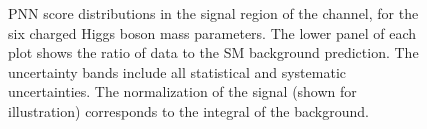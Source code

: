 \begin{figure}
		  \caption{\label{fig:taujets_SR_PNNscores_body} PNN score distributions in the
		signal region of the \taujets channel, for the six charged Higgs boson mass parameters.
		The lower panel of each plot shows the ratio of data to the \acrshort{SM} background prediction. The uncertainty bands include all statistical and systematic uncertainties. 
		The normalization of the signal (shown for illustration) corresponds to the integral of the background.}
		\end{figure}

